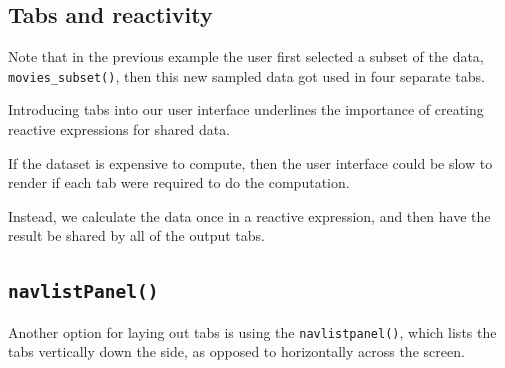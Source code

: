 \documentclass[
  letterpaper,
  DIV=11,
  numbers=noendperiod]{scrreprt}
\newenvironment{Shaded}{\begin{snugshade}}{\end{snugshade}}
\newcommand{\AttributeTok}[1]{\textcolor[rgb]{0.40,0.46,0.14}{#1}}
\newcommand{\FunctionTok}[1]{\textcolor[rgb]{0.28,0.35,0.67}{#1}}
\newcommand{\NormalTok}[1]{\textcolor[rgb]{0.00,0.46,0.62}{#1}}
\newcommand{\SpecialCharTok}[1]{\textcolor[rgb]{0.37,0.37,0.37}{#1}}
\newcommand{\StringTok}[1]{\textcolor[rgb]{0.13,0.47,0.30}{#1}}
\begin{document}
\hypertarget{tabs-and-reactivity}{%
\subsection{Tabs and reactivity}\label{tabs-and-reactivity}}

Note that in the previous example the user first selected a subset of
the data, \texttt{movies\_subset()}, then this new sampled data got used
in four separate tabs.

Introducing tabs into our user interface underlines the importance of
creating reactive expressions for shared data.

If the dataset is expensive to compute, then the user interface could be
slow to render if each tab were required to do the computation.

Instead, we calculate the data once in a reactive expression, and then
have the result be shared by all of the output tabs.

\hypertarget{navlistpanel}{%
\subsection{\texorpdfstring{\texttt{navlistPanel()}}{navlistPanel()}}\label{navlistpanel}}

Another option for laying out tabs is using the \texttt{navlistpanel()},
which lists the tabs vertically down the side, as opposed to
horizontally across the screen.

\begin{Shaded}
\end{Shaded}
\end{document}
